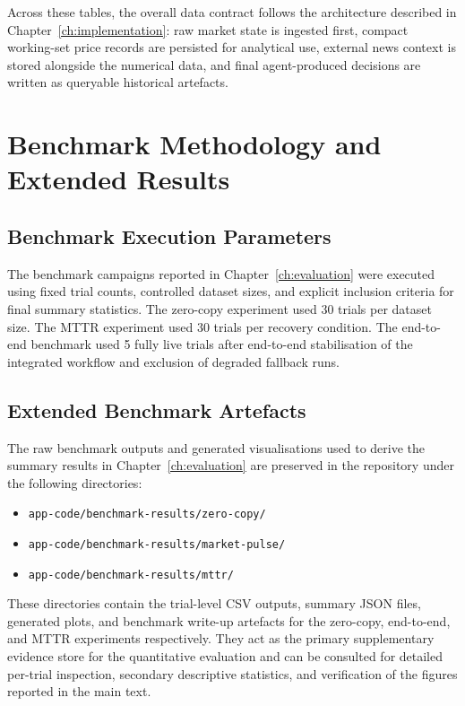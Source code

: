 \documentclass[12pt, a4paper]{report}
\begin{document}
Across these tables, the overall data contract follows the architecture described in
Chapter~\ref{ch:implementation}: raw market state is ingested first, compact
working-set price records are persisted for analytical use, external news context is
stored alongside the numerical data, and final agent-produced decisions are written as
queryable historical artefacts.

\chapter{Benchmark Methodology and Extended Results}
\label{app:benchmarks}

\section{Benchmark Execution Parameters}
\label{app:bench_params}

The benchmark campaigns reported in Chapter~\ref{ch:evaluation} were executed using
fixed trial counts, controlled dataset sizes, and explicit inclusion criteria for
final summary statistics. The zero-copy experiment used 30 trials per dataset size.
The MTTR experiment used 30 trials per recovery condition. The end-to-end benchmark
used 5 fully live trials after end-to-end stabilisation of the integrated workflow
and exclusion of degraded fallback runs.

\section{Extended Benchmark Artefacts}
\label{app:bench_tables}

The raw benchmark outputs and generated visualisations used to derive the summary
results in Chapter~\ref{ch:evaluation} are preserved in the repository under the
following directories:

\begin{itemize}
  \item \texttt{app-code/benchmark-results/zero-copy/}
  \item \texttt{app-code/benchmark-results/market-pulse/}
  \item \texttt{app-code/benchmark-results/mttr/}
\end{itemize}

These directories contain the trial-level CSV outputs, summary JSON files, generated
plots, and benchmark write-up artefacts for the zero-copy, end-to-end, and MTTR
experiments respectively. They act as the primary supplementary evidence store for
the quantitative evaluation and can be consulted for detailed per-trial inspection,
secondary descriptive statistics, and verification of the figures reported in the
main text.
\end{document}
